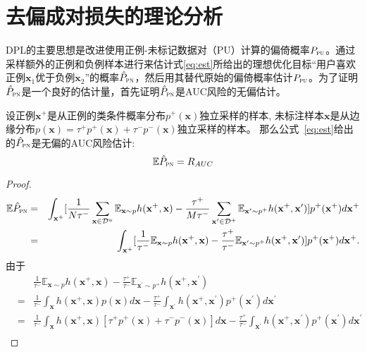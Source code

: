 \section{去偏成对损失的理论分析}
DPL的主要思想是改进使用正例-未标记数据对（PU）计算的偏倚概率$P_\textsc{pu}$。通过采样额外的正例和负例样本进行来估计式\eqref{eq:est}所给出的理想优化目标“用户喜欢正例$\mathbf{x}_1$优于负例$\mathbf{x}_2$”的概率$\hat P_\textsc{pn}$，然后用其替代原始的偏倚概率估计$P_\textsc{pu}$。为了证明$\hat P_\textsc{pn}$是一个良好的估计量，首先证明$\hat P_\textsc{pn}$是AUC风险的无偏估计。
\begin{lemma}\label{lemma:auc} 设正例$\mathbf{x}^+$是从正例的类条件概率分布$p^+(\mathbf{x})$独立采样的样本, 未标注样本$\mathbf{x}$是从边缘分布$p(\mathbf{x}) = \tau^+ p^+(\mathbf{x})+ \tau^- p^-(\mathbf{x})$独立采样的样本。 那么公式~\eqref{eq:est}给出的$\hat P_\textsc{pn}$是无偏的AUC风险估计:
	\[\mathbb{E}\hat P_\textsc{pn} = R_{AUC}\]
	\begin{proof}
		\begin{eqnarray}
			\mathbb{E}\hat P_\textsc{pn} &=& \int_{\mathbf{x}^+} [\frac{1}{N\tau^-}
			\sum_{\mathbf{x} \in \mathcal{D}^u} \mathbb{E}_{\mathbf{x}\sim p}h(\mathbf{x}^+,\mathbf{x}) - \frac{\tau^+}{M\tau^-}\sum_{\mathbf{x}^\prime\in \mathcal{D}^+}\mathbb{E}_{\mathbf{x}^\prime \sim p^+}h(\mathbf{x}^+, \mathbf{x}^\prime)]p^+(\mathbf{x}^+)d\mathbf{x}^+ \\
			&=&\int_{\mathbf{x}^+} [\frac{1}{\tau^-}
			\mathbb{E}_{\mathbf{x}\sim p}h(\mathbf{x}^+,\mathbf{x}) - \frac{\tau^+}{\tau^-}\mathbb{E}_{\mathbf{x}^\prime \sim p^+}h(\mathbf{x}^+, \mathbf{x}^\prime)]p^+(\mathbf{x}^+)d\mathbf{x}^+ \label{eq:unbiasauc}.
		\end{eqnarray}
由于
		\begin{eqnarray}
			&&\frac{1}{\tau^-}\mathbb{E}_{\mathbf{x}\sim p}h(\mathbf{x}^+,\mathbf{x}) - \frac{\tau^+}{\tau^-}\mathbb{E}_{\mathbf{x}^\prime\sim p^+}h(\mathbf{x}^+, \mathbf{x}^\prime)\nonumber \\
			&=&\frac{1}{\tau^-} \int_\mathbf{x}h(\mathbf{x}^+,\mathbf{x})p(\mathbf{x})d\mathbf{x} - \frac{\tau^+}{\tau^-} \int_\mathbf{x^\prime}h(\mathbf{x}^+, \mathbf{x}^\prime)p^+(\mathbf{x}^\prime)d\mathbf{x^\prime} \nonumber \\
			&=&\frac{1}{\tau^-} \int_\mathbf{x}h(\mathbf{x}^+,\mathbf{x})[\tau^+p^+(\mathbf{x}) + \tau^-p^-(\mathbf{x}) ]d\mathbf{x} - \frac{\tau^+}{\tau^-} \int_\mathbf{x^\prime}h(\mathbf{x}^+, \mathbf{x}^\prime)p^+(\mathbf{x}^\prime)d\mathbf{x^\prime}  \label{eq:marginal} \\

\end{eqnarray}
\end{proof}
\end{lemma}
